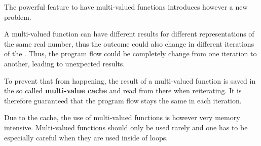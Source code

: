 		The powerful feature to have multi-valued functions introduces however a
    new problem.

		A multi-valued function can have different results for different representations of the same real number,
		thus the outcome could also change in different iterations of the \irram. 
		Thus, the program flow could be completely change from one iteration to another, leading to unexpected results.

		To prevent that from happening, the result of a multi-valued function is saved in the so called \textbf{multi-value cache}
		and read from there when reiterating. 
		It is therefore guaranteed that the program flow stays the same in each iteration.
		
    Due to the cache, the use of multi-valued functions is however very memory
    intensive.
    Multi-valued functions should only be used rarely and one has to be
    especially careful when they are used inside of loops.
